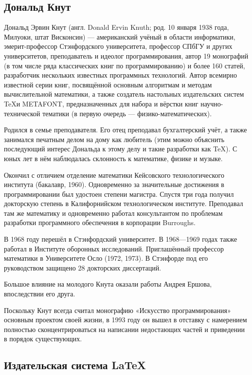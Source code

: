 \documentclass[a4paper,12pt]{article} %
\begin{document}
\subsection*{Дональд Кнут}


\hspace*{1cm} Дональд Эрвин Кнут (англ. Donald Ervin Knuth; род. 10 января 1938 года, Милуоки, штат Висконсин) — американский учёный в области информатики, эмерит-профессор Стэнфордского университета, профессор СПбГУ и других университетов, преподаватель и идеолог программирования, автор 19 монографий (в том числе ряда классических книг по программированию) и более 160 статей, разработчик нескольких известных программных технологий. Автор всемирно известной серии книг, посвящённой основным алгоритмам и методам вычислительной математики, а также создатель настольных издательских систем \TeX и METAFONT, предназначенных для набора и вёрстки книг научно-технической тематики (в первую очередь — физико-математических).

Родился в семье преподавателя. Его отец преподавал бухгалтерский учёт, а также занимался печатным делом на дому как любитель (этим можно объяснить последующий интерес Дональда к этому делу и такие разработки как \TeX). С юных лет в нём наблюдалась склонность к математике, физике и музыке.

Окончил с отличием отделение математики Кейсовского технологического института (бакалавр, 1960). Одновременно за значительные достижения в программировании был удостоен степени магистра. Спустя три года получил докторскую степень в Калифорнийском технологическом институте. Преподавал там же математику и одновременно работал консультантом по проблемам разработки программного обеспечения в корпорации Burroughs.

В 1968 году перешёл в Стэнфордский университет. В 1968—1969 годах также работал в Институте оборонных исследований. Приглашённый профессор математики в Университете Осло (1972, 1973). В Стэнфорде под его руководством защищено 28 докторских диссертаций.

Большое влияние на молодого Кнута оказали работы Андрея Ершова, впоследствии его друга.

Поскольку Кнут всегда считал монографию «Искусство программирования» основным проектом своей жизни, в 1993 году он вышел в отставку с намерением полностью сконцентрироваться на написании недостающих частей и приведении в порядок существующих.

\subsection*{Издательская система \LaTeX}
\end{document}
